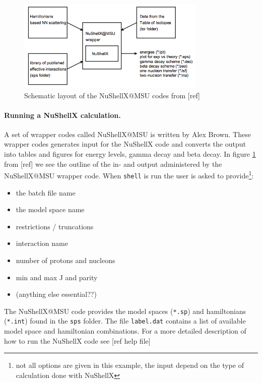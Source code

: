 \documentclass[twoside]{article}
\begin{document}
\begin{figure}[ht]
\centering
\includegraphics[width=0.8\textwidth]{nushellX_structure_from_ref.png}
\caption{Schematic layout of the NuShellX@MSU codes from [ref] }
\label{fig: nushellx_struct}
\end{figure}

\paragraph{Running a NuShellX calculation.} A set of wrapper codes called NuShellX@MSU is written by Alex Brown. These wrapper codes generates input for the NuShellX code and converts the output into tables and figures for energy levels, gamma decay and beta decay. In figure \ref{fig: nushellx_struct} from [ref] we see the outline of the in- and output administered by the NuShellX@MSU wrapper code. When \texttt{shell} is run the user is asked to provide\footnote{not all options are given in this example, the input depend on the type of calculation done with NuShellX}:

\begin{itemize}
\item the batch file name
\item the model space name
\item restrictions / truncations
\item interaction name
\item number of protons and nucleons
\item min and max J and parity
\item (anything else essential??)
\end{itemize}

The NuShellX@MSU code provides the model spaces (\texttt{*.sp}) and hamiltonians (\texttt{*.int}) found in the \texttt{sps} folder. The file \texttt{label.dat} contains a list of available model space and hamiltonian combinations. For a more detailed description of how to run the NuShellX code see [ref help file]
\end{document}
